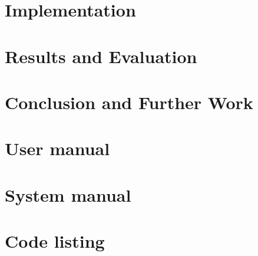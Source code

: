 \documentclass[12pt]{ucl_thesis}
\begin{document}
\chapter{Implementation}
\label{chp:impl}



\chapter{Results and Evaluation}
\label{chp:test&results}



\chapter{Conclusion and Further Work}
\label{chp:conc}





\cleardoublepage
\appendix

\chapter{User manual}


\chapter{System manual}


\chapter{Code listing}



%

%




\end{document}
